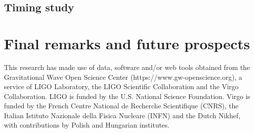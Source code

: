 \documentclass[twocolumn,showpacs,preprintnumbers,nofootinbib,prd,
superscriptaddress,10pt]{revtex4-1}
\begin{document}
\subsection{Timing study}
\label{sec:timing}


\section{Final remarks and future prospects}
\label{sec:end}
\blindtext




        \begin{acknowledgments}
          This research has made use of data, software and/or web tools obtained 
          from the Gravitational Wave Open Science Center (https://www.gw-openscience.org), 
          a service of LIGO Laboratory, the LIGO Scientific Collaboration and the 
          Virgo Collaboration. LIGO is funded by the U.S. National Science Foundation. 
          Virgo is funded by the French Centre National de Recherche Scientifique (CNRS), 
          the Italian Istituto Nazionale della Fisica Nucleare (INFN) and the 
          Dutch Nikhef, with contributions by Polish and Hungarian institutes.
        \end{acknowledgments}

	
	
\end{document}

